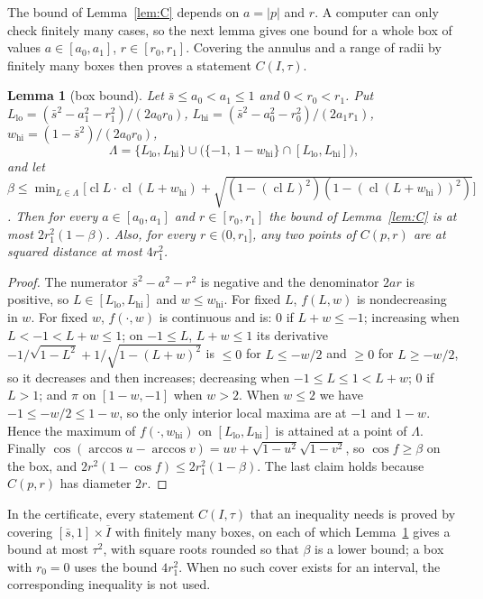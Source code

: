 \documentclass[11pt]{article}
\newcommand{\sbar}{\bar{s}}
\newcommand{\cl}{\operatorname{cl}}
\newtheorem{lemma}[theorem]{Lemma}
\theoremstyle{remark}
\begin{document}
The bound of Lemma~\ref{lem:C} depends on $a = |p|$ and $r$. A computer
can only check finitely many cases, so the next lemma gives one bound for
a whole box of values $a \in [a_0, a_1]$, $r \in [r_0, r_1]$. Covering
the annulus and a range of radii by finitely many boxes then proves a
statement $C(I, \tau)$.

\begin{lemma}[box bound]\label{lem:Cbox}
Let $\sbar \le a_0 < a_1 \le 1$ and $0 < r_0 < r_1$. Put
$L_{\mathrm{lo}} = (\sbar^2 - a_1^2 - r_1^2)/(2a_0r_0)$,
$L_{\mathrm{hi}} = (\sbar^2 - a_0^2 - r_0^2)/(2a_1r_1)$,
$w_{\mathrm{hi}} = (1-\sbar^2)/(2a_0r_0)$,
\[
  \Lambda = \{L_{\mathrm{lo}}, L_{\mathrm{hi}}\} \cup
  \bigl(\{-1,\, 1 - w_{\mathrm{hi}}\} \cap [L_{\mathrm{lo}}, L_{\mathrm{hi}}]\bigr),
\]
and let $\beta \le \min_{L \in \Lambda}\bigl[\cl L\cdot \cl(L+w_{\mathrm{hi}})
+ \sqrt{(1 - (\cl L)^2)(1 - (\cl(L+w_{\mathrm{hi}}))^2)}\bigr]$. Then for every
$a \in [a_0,a_1]$ and $r \in [r_0, r_1]$ the bound of Lemma~\ref{lem:C} is at
most $2r_1^2(1-\beta)$. Also, for every $r \in (0, r_1]$, any two points of
$C(p,r)$ are at squared distance at most $4r_1^2$.
\end{lemma}

\begin{proof}
The numerator $\sbar^2 - a^2 - r^2$ is negative and the denominator $2ar$ is
positive, so $L \in [L_{\mathrm{lo}}, L_{\mathrm{hi}}]$ and
$w \le w_{\mathrm{hi}}$. For fixed $L$, $f(L,w)$ is nondecreasing in $w$.
For fixed $w$, $f(\cdot,w)$ is continuous and is: $0$ if $L + w \le -1$;
increasing when $L < -1 < L + w \le 1$; on $-1 \le L$, $L + w \le 1$ its
derivative $-1/\sqrt{1-L^2} + 1/\sqrt{1-(L+w)^2}$ is $\le 0$ for
$L \le -w/2$ and $\ge 0$ for $L \ge -w/2$, so it decreases and then
increases; decreasing when $-1 \le L \le 1 < L+w$; $0$ if $L > 1$; and
$\pi$ on $[1-w, -1]$ when $w > 2$. When $w \le 2$ we have
$-1 \le -w/2 \le 1 - w$, so the only interior local maxima are at $-1$ and
$1-w$. Hence the maximum of $f(\cdot, w_{\mathrm{hi}})$ on
$[L_{\mathrm{lo}}, L_{\mathrm{hi}}]$ is attained at a point of $\Lambda$.
Finally $\cos(\arccos u - \arccos v) = uv + \sqrt{1-u^2}\sqrt{1-v^2}$, so
$\cos f \ge \beta$ on the box, and $2r^2(1-\cos f) \le 2r_1^2(1-\beta)$.
The last claim holds because $C(p,r)$ has diameter $2r$.
\end{proof}

In the certificate, every statement $C(I,\tau)$ that an inequality needs
is proved by covering $[\sbar, 1] \times \overline I$ with finitely many
boxes, on each of which Lemma~\ref{lem:Cbox} gives a bound at most
$\tau^2$, with square roots rounded so that $\beta$ is a lower bound; a
box with $r_0 = 0$ uses the bound $4r_1^2$. When no such cover exists for
an interval, the corresponding inequality is not used.
\end{document}
